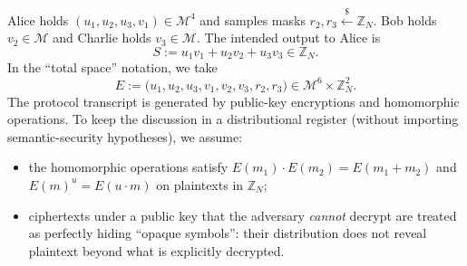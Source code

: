 \documentclass[11pt,a4paper]{article}
\theoremstyle{definition}
\theoremstyle{plain}
\newcommand{\Z}{\mathbb{Z}}
\begin{document}
Alice holds $(u_1,u_2,u_3,v_1)\in\mathcal{M}^4$ and samples masks $r_2,r_3\xleftarrow{\$}\Z_N$.
Bob holds $v_2\in\mathcal{M}$ and Charlie holds $v_3\in\mathcal{M}$.
The intended output to Alice is
\[
S:=u_1v_1+u_2v_2+u_3v_3\in \Z_N.
\]
In the ``total space'' notation, we take
\[
E:=\bigl(u_1,u_2,u_3,v_1,v_2,v_3,r_2,r_3\bigr)\in \mathcal{M}^6\times \Z_N^{2}.
\]
The protocol transcript is generated by public-key encryptions and homomorphic operations.
To keep the discussion in a distributional register (without importing semantic-security hypotheses), we assume:
\begin{itemize}
    \item the homomorphic operations satisfy $E(m_1)\cdot E(m_2)=E(m_1+m_2)$ and $E(m)^u = E(u\cdot m)$ on plaintexts in $\Z_N$;
    \item ciphertexts under a public key that the adversary \emph{cannot} decrypt are treated as perfectly hiding ``opaque symbols'': their distribution does not reveal plaintext beyond what is explicitly decrypted.
\end{itemize}
\end{document}
